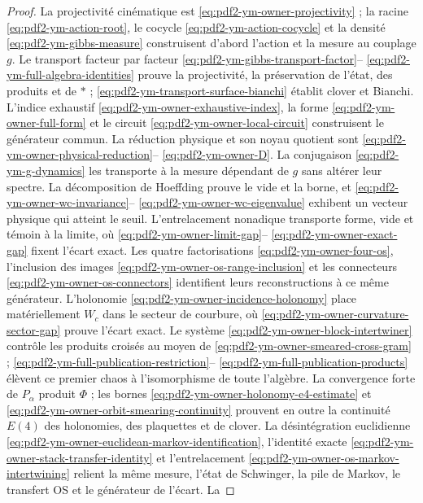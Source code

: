 \begin{proof}
La projectivité cinématique est \eqref{eq:pdf2-ym-owner-projectivity} ; la racine
\eqref{eq:pdf2-ym-action-root}, le cocycle
\eqref{eq:pdf2-ym-action-cocycle} et la densité
\eqref{eq:pdf2-ym-gibbs-measure} construisent d’abord l’action et la mesure au
couplage $g$. Le transport facteur par facteur
\eqref{eq:pdf2-ym-gibbs-transport-factor}--
\eqref{eq:pdf2-ym-full-algebra-identities} prouve la projectivité, la préservation de
l’état, des produits et de $*$ ;
\eqref{eq:pdf2-ym-transport-surface-bianchi} établit clover et Bianchi. L’indice exhaustif
\eqref{eq:pdf2-ym-owner-exhaustive-index}, la forme
\eqref{eq:pdf2-ym-owner-full-form} et le circuit
\eqref{eq:pdf2-ym-owner-local-circuit} construisent le générateur commun. La réduction
physique et son noyau quotient sont
\eqref{eq:pdf2-ym-owner-physical-reduction}--
\eqref{eq:pdf2-ym-owner-D}. La conjugaison
\eqref{eq:pdf2-ym-g-dynamics} les transporte à la mesure dépendant de $g$ sans
altérer leur spectre. La décomposition de Hoeffding prouve le vide et la borne, et
\eqref{eq:pdf2-ym-owner-wc-invariance}--
\eqref{eq:pdf2-ym-owner-wc-eigenvalue} exhibent un vecteur physique qui atteint le
seuil. L’entrelacement nonadique transporte forme, vide et témoin à la limite, où
\eqref{eq:pdf2-ym-owner-limit-gap}--
\eqref{eq:pdf2-ym-owner-exact-gap} fixent l’écart exact. Les quatre
factorisations \eqref{eq:pdf2-ym-owner-four-os}, l’inclusion des images
\eqref{eq:pdf2-ym-owner-os-range-inclusion} et les connecteurs
\eqref{eq:pdf2-ym-owner-os-connectors} identifient leurs reconstructions à ce
même générateur. L’holonomie
\eqref{eq:pdf2-ym-owner-incidence-holonomy} place matériellement $W_c$ dans le secteur
de courbure, où \eqref{eq:pdf2-ym-owner-curvature-sector-gap} prouve l’écart
exact. Le système \eqref{eq:pdf2-ym-owner-block-intertwiner} contrôle les produits
croisés au moyen de \eqref{eq:pdf2-ym-owner-smeared-cross-gram} ;
\eqref{eq:pdf2-ym-full-publication-restriction}--
\eqref{eq:pdf2-ym-full-publication-products} élèvent ce premier chaos à l’isomorphisme
de toute l’algèbre. La convergence forte de $P_\alpha$ produit $\Phi$ ; les bornes
\eqref{eq:pdf2-ym-owner-holonomy-e4-estimate} et
\eqref{eq:pdf2-ym-owner-orbit-smearing-continuity} prouvent en outre la continuité
$E(4)$ des holonomies, des plaquettes et de clover. La désintégration euclidienne
\eqref{eq:pdf2-ym-owner-euclidean-markov-identification}, l’identité exacte
\eqref{eq:pdf2-ym-owner-stack-transfer-identity} et l’entrelacement
\eqref{eq:pdf2-ym-owner-os-markov-intertwining} relient la même mesure,
l’état de Schwinger, la pile de Markov, le transfert OS et le générateur de l’écart. La

\end{proof}
